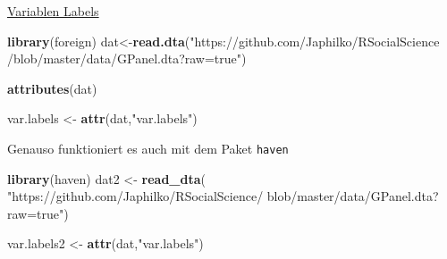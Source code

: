 \documentclass[ignorenonframetext,]{beamer}
\newenvironment{Shaded}{}{}
\newcommand{\KeywordTok}[1]{\textcolor[rgb]{0.00,0.44,0.13}{\textbf{{#1}}}}
\newcommand{\StringTok}[1]{\textcolor[rgb]{0.25,0.44,0.63}{{#1}}}
\newcommand{\NormalTok}[1]{{#1}}
\begin{document}
\begin{frame}[fragile]{\href{https://stackoverflow.com/questions/2151147/using-stata-variable-labels-in-r}{Variablen
Labels}}

\begin{Shaded}
\begin{Highlighting}[]
\KeywordTok{library}\NormalTok{(foreign)}
\NormalTok{dat<-}\KeywordTok{read.dta}\NormalTok{(}\StringTok{"https://github.com/Japhilko/RSocialScience}
\StringTok{              /blob/master/data/GPanel.dta?raw=true"}\NormalTok{)}
\end{Highlighting}
\end{Shaded}

\begin{Shaded}
\begin{Highlighting}[]
\KeywordTok{attributes}\NormalTok{(dat)}
\end{Highlighting}
\end{Shaded}

\begin{Shaded}
\begin{Highlighting}[]
\NormalTok{var.labels <-}\StringTok{ }\KeywordTok{attr}\NormalTok{(dat,}\StringTok{"var.labels"}\NormalTok{)}
\end{Highlighting}
\end{Shaded}

\begin{block}{Genauso funktioniert es auch mit dem Paket \texttt{haven}}

\begin{Shaded}
\begin{Highlighting}[]
\KeywordTok{library}\NormalTok{(haven)}
\NormalTok{dat2 <-}\StringTok{ }\KeywordTok{read_dta}\NormalTok{(}
\StringTok{"https://github.com/Japhilko/RSocialScience/}
\StringTok{blob/master/data/GPanel.dta?raw=true"}\NormalTok{)}

\NormalTok{var.labels2 <-}\StringTok{ }\KeywordTok{attr}\NormalTok{(dat,}\StringTok{"var.labels"}\NormalTok{)}
\end{Highlighting}
\end{Shaded}

\end{block}

\end{frame}
\end{document}
